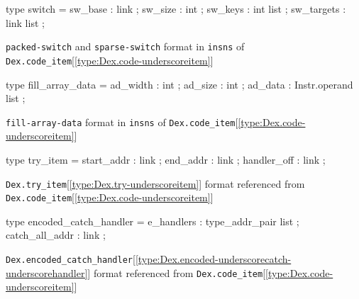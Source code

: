\documentclass[11pt]{article}
\begin{document}
\label{type:Dex.switch}\begin{ocamldoccode}
type switch = {}
  sw_base : link ;
  sw_size : int ;
  sw_keys : int list ;
  sw_targets : link list ;
{}
\end{ocamldoccode}
\begin{ocamldocdescription}
{\tt{packed-switch}} and {\tt{sparse-switch}} format in {\tt{insns}} of {\tt{Dex.code\_item}}[\ref{type:Dex.code-underscoreitem}]


\end{ocamldocdescription}




\label{type:Dex.fill-underscorearray-underscoredata}\begin{ocamldoccode}
type fill_array_data = {}
  ad_width : int ;
  ad_size : int ;
  ad_data : Instr.operand list ;
{}
\end{ocamldoccode}
\begin{ocamldocdescription}
{\tt{fill-array-data}} format in {\tt{insns}} of {\tt{Dex.code\_item}}[\ref{type:Dex.code-underscoreitem}]


\end{ocamldocdescription}




\label{type:Dex.try-underscoreitem}\begin{ocamldoccode}
type try_item = {}
  start_addr : link ;
  end_addr : link ;
  handler_off : link ;
{}
\end{ocamldoccode}
\begin{ocamldocdescription}
{\tt{Dex.try\_item}}[\ref{type:Dex.try-underscoreitem}] format referenced from {\tt{Dex.code\_item}}[\ref{type:Dex.code-underscoreitem}]


\end{ocamldocdescription}




\label{type:Dex.encoded-underscorecatch-underscorehandler}\begin{ocamldoccode}
type encoded_catch_handler = {}
  e_handlers : type_addr_pair list ;
  catch_all_addr : link ;
{}
\end{ocamldoccode}
\begin{ocamldocdescription}
{\tt{Dex.encoded\_catch\_handler}}[\ref{type:Dex.encoded-underscorecatch-underscorehandler}] format referenced from {\tt{Dex.code\_item}}[\ref{type:Dex.code-underscoreitem}]


\end{ocamldocdescription}
\end{document}
